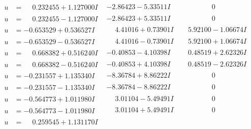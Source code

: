 \documentclass[1p]{elsarticle_modified}
\theoremstyle{definition}
\begin{document}
$$\begin{array}{c|c|c}
 \hline 
\begin{aligned}
u &= \phantom{-}0.232455 + 1.127000 I\end{aligned}
 & -2.86423 - 5.33511 I & \phantom{-0.000000 } 0 \\ \hline\begin{aligned}
u &= \phantom{-}0.232455 - 1.127000 I\end{aligned}
 & -2.86423 + 5.33511 I & \phantom{-0.000000 } 0 \\ \hline\begin{aligned}
u &= -0.653529 + 0.536527 I\end{aligned}
 & \phantom{-}4.41016 + 0.73901 I & \phantom{-}5.92100 - 1.06674 I \\ \hline\begin{aligned}
u &= -0.653529 - 0.536527 I\end{aligned}
 & \phantom{-}4.41016 - 0.73901 I & \phantom{-}5.92100 + 1.06674 I \\ \hline\begin{aligned}
u &= \phantom{-}0.668382 + 0.516240 I\end{aligned}
 & -0.40853 - 4.10398 I & \phantom{-}0.48519 + 2.62326 I \\ \hline\begin{aligned}
u &= \phantom{-}0.668382 - 0.516240 I\end{aligned}
 & -0.40853 + 4.10398 I & \phantom{-}0.48519 - 2.62326 I \\ \hline\begin{aligned}
u &= -0.231557 + 1.135340 I\end{aligned}
 & -8.36784 + 8.86222 I & \phantom{-0.000000 } 0 \\ \hline\begin{aligned}
u &= -0.231557 - 1.135340 I\end{aligned}
 & -8.36784 - 8.86222 I & \phantom{-0.000000 } 0 \\ \hline\begin{aligned}
u &= -0.564773 + 1.011980 I\end{aligned}
 & \phantom{-}3.01104 - 5.49491 I & \phantom{-0.000000 } 0 \\ \hline\begin{aligned}
u &= -0.564773 - 1.011980 I\end{aligned}
 & \phantom{-}3.01104 + 5.49491 I & \phantom{-0.000000 } 0 \\ \hline\begin{aligned}
u &= \phantom{-}0.259545 + 1.131170 I\end{aligned}

\end{array}$$
\end{document}
